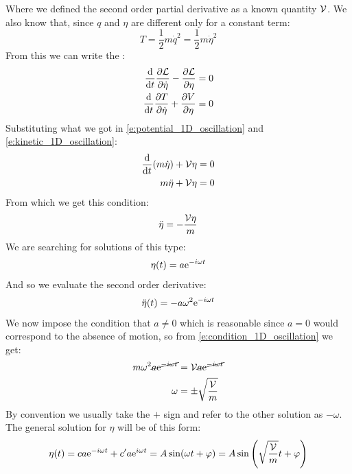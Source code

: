 Where we defined the second order partial derivative as a known quantity $\mathcal{V}$. We also know that, since $q$ and $\eta$ are different only for a constant term:
\begin{equation} \label{e:kinetic_1D_oscillation}
    T = \dfrac{1}{2}m\dot{q}^2 = \dfrac{1}{2}m\dot{\eta}^2
\end{equation}
From this we can write the \eleref :
\begin{equation}
    \begin{split}
        \dfrac{\mathrm{d} }{\mathrm{d}t}\dfrac{\partial \mathcal{L}}{\partial \dot{\eta}} -\dfrac{\partial \mathcal{L}}{\partial \eta} = 0 \\
        \dfrac{\mathrm{d} }{\mathrm{d}t}\dfrac{\partial T}{\partial \dot{\eta}} + \dfrac{\partial V}{\partial \eta} = 0
    \end{split}
\end{equation}
Substituting what we got in \eqref{e:potential_1D_oscillation} and \eqref{e:kinetic_1D_oscillation}:
\begin{equation}
    \begin{split}
        \dfrac{\mathrm{d} }{\mathrm{d}t}(m\dot{\eta}) + \mathcal{V}\eta &= 0\\
        m\ddot{\eta} + \mathcal{V}\eta &= 0
    \end{split}
\end{equation}
From which we get this condition:
\begin{equation} \label{e:condition_1D_oscillation}
    \ddot{\eta} =- \dfrac{\mathcal{V}\eta}{m}
\end{equation}
We are searching for solutions of this type:
\begin{equation}
    \eta (t) = a\mathrm{e}^{-i\omega t}
\end{equation}
And so we evaluate the second order derivative:
\begin{eqnarray}
    \ddot{\eta} (t) = -a\omega^2\mathrm{e}^{-i\omega t}
\end{eqnarray}
We now impose the condition that $a\neq 0$ which is reasonable since $a=0$ would correspond to the absence of motion, so from \eqref{e:condition_1D_oscillation} we get:
\begin{equation}
    \begin{split}
        m\omega^2\cancel{a\mathrm{e}^{-i\omega t}} &= \mathcal{V}\cancel{a\mathrm{e}^{-i\omega t}}\\
        \omega &= \pm \sqrt{\dfrac{\mathcal{V}}{m}}
    \end{split}
\end{equation}
By convention we usually take the $+$ sign and refer to the other solution as $-\omega$. The general solution for $\eta$ will be of this form:
\begin{equation}
    \eta (t) = ca\mathrm{e}^{-i\omega t} + c'a\mathrm{e}^{i\omega t} = A \sin(\omega t + \varphi) = A \sin\left(\sqrt{\dfrac{\mathcal{V}}{m}} t + \varphi\right)
\end{equation}
